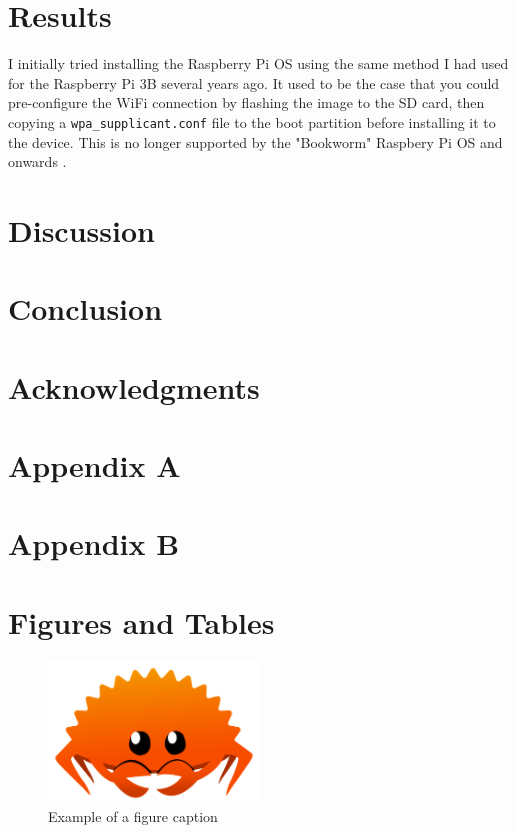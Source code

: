 \documentclass[12pt]{article}
\begin{document}
\section{Results}\label{sec:results}
I initially tried installing the Raspberry Pi OS using the same method I had used for the Raspberry Pi 3B several years ago. It used to be the case that you could pre-configure the WiFi connection by flashing the image to the SD card, then copying a \verb|wpa_supplicant.conf| file to the boot partition before installing it to the device. This is no longer supported by the "Bookworm" Raspbery Pi OS and onwards \cite{raspberrypi_config}. 

\section{Discussion}\label{sec:discussion}
\lipsum[8-9] %

\section{Conclusion}\label{sec:conclusion}
\lipsum[10] %




\section{Acknowledgments}
\lipsum[11] %

\appendix
\section{Appendix A}
\lipsum[12] %

\section{Appendix B}
\lipsum[13] %

\section{Figures and Tables}
\begin{figure}[h]
\centering
\includegraphics[width=0.5\textwidth]{ferris_the_crab.png} %
\caption{Example of a figure caption}
\label{fig:example}
\end{figure}
\end{document}
